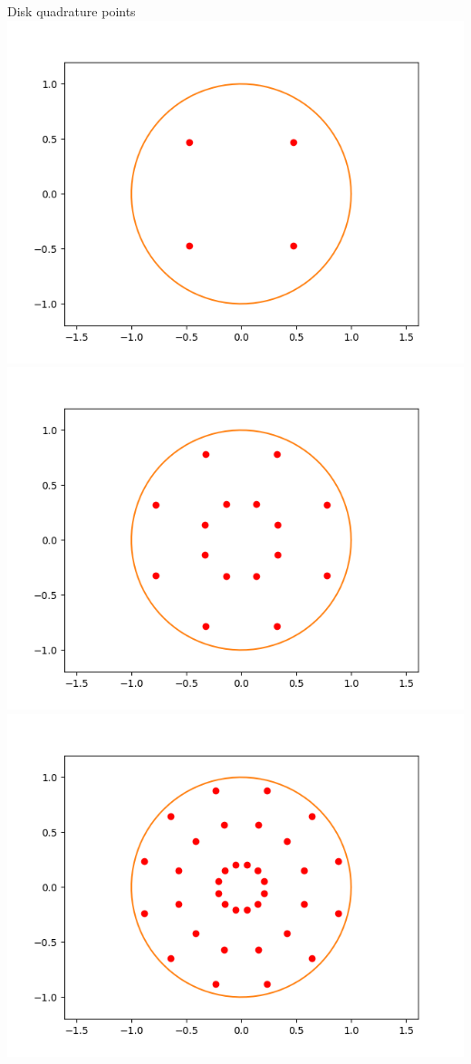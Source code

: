 \documentclass[10pt,a4paper]{letter}
\begin{document}
 

Disk quadrature points\\

\includegraphics[scale=.5]{disk_n1}
\includegraphics[scale=.5]{disk_n2}
\includegraphics[scale=.5]{disk_n3}
\end{document}
